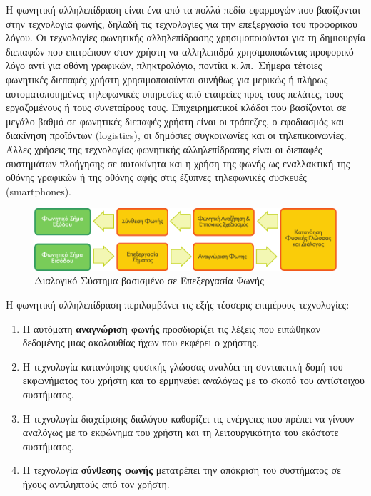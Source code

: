 \begin{multicols}{2}
Η φωνητική αλληλεπίδραση είναι ένα από τα πολλά πεδία εφαρμογών που βασίζονται στην τεχνολογία φωνής, δηλαδή τις τεχνολογίες για την επεξεργασία του προφορικού λόγου. Οι τεχνολογίες φωνητικής αλληλεπίδρασης χρησιμοποιούνται για τη δημιουργία διεπαφών που επιτρέπουν στον χρήστη να αλληλεπιδρά χρησιμοποιώντας προφορικό λόγο αντί για οθόνη γραφικών, πληκτρολόγιο, ποντίκι κ.\,λπ.~Σήμερα τέτοιες φωνητικές διεπαφές χρήστη χρησιμοποιούνται συνήθως για μερικώς ή πλήρως αυτοματοποιημένες τηλεφωνικές υπηρεσίες από εταιρείες προς τους πελάτες, τους εργαζομένους ή τους συνεταίρους τους. Επιχειρηματικοί κλάδοι που βασίζονται σε μεγάλο βαθμό σε φωνητικές διεπαφές χρήστη είναι οι τράπεζες, ο εφοδιασμός και διακίνηση προϊόντων (logistics), οι δημόσιες συγκοινωνίες και οι τηλεπικοινωνίες. Άλλες χρήσεις της τεχνολογίας φωνητικής αλληλεπίδρασης είναι οι διεπαφές συστημάτων πλοήγησης σε αυτοκίνητα και η χρήση της φωνής ως εναλλακτική της οθόνης γραφικών ή της οθόνης αφής στις έξυπνες τηλεφωνικές συσκευές (smartphones).

\begin{figure}[htb]
  \center  \includegraphics[width=\textwidth]{../_media/greek/simple_speech-based_dialogue_architecture}
  \center
  \caption{Διαλογικό Σύστημα βασισμένο σε Επεξεργασία Φωνής}
  \label{fig:dialoguearch_de}
\end{figure}

Η φωνητική αλληλεπίδραση περιλαμβάνει τις εξής τέσσερις επιμέρους τεχνολογίες:

\begin{enumerate}
\item Η αυτόματη \textbf{αναγνώριση φωνής} προσδιορίζει τις λέξεις που ειπώθηκαν δεδομένης μιας ακολουθίας ήχων που εκφέρει ο χρήστης.
\item Η τεχνολογία κατανόησης φυσικής γλώσσας αναλύει τη συντακτική δομή του εκφωνήματος του χρήστη και το ερμηνεύει αναλόγως με το σκοπό του αντίστοιχου συστήματος.
\item Η τεχνολογία διαχείρισης διαλόγου καθορίζει τις ενέργειες που πρέπει να γίνουν αναλόγως με το εκφώνημα του χρήστη και τη λειτουργικότητα του εκάστοτε συστήματος.    
\item Η τεχνολογία \textbf{σύνθεσης φωνής} μετατρέπει την απόκριση του συστήματος σε ήχους αντιληπτούς από τον χρήστη.
\end{enumerate}


\end{multicols}
